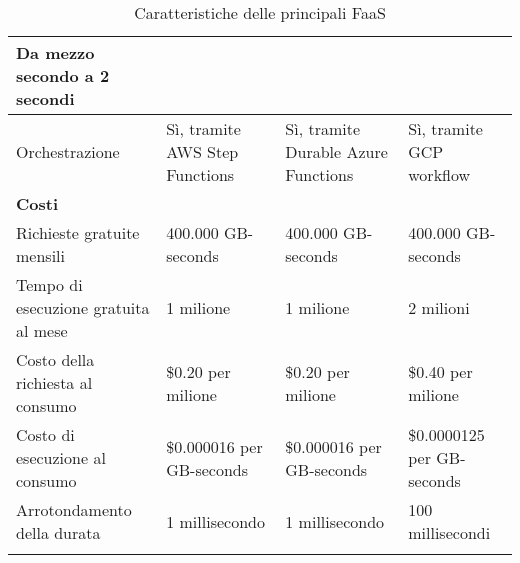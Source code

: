 \begin{longtable} {|P{3.5cm}|P{3.7cm}|P{3.7cm}|P{3.7cm}|}
    Da mezzo secondo a 2 secondi                                                                                                                                               \\
    \hline
    Orchestrazione                                  &
    Sì, tramite AWS Step Functions                  &
    Sì, tramite Durable Azure Functions             &
    Sì, tramite GCP workflow                                                                                                                                                   \\
    \hline
    \textbf{Costi}                                  &                                                             &                          &                                 \\
    \hline
    Richieste gratuite mensili                      &
    400.000 GB-seconds                              &
    400.000 GB-seconds                              &
    400.000 GB-seconds                                                                                                                                                         \\
    \hline
    Tempo di esecuzione gratuita al mese            &
    1 milione                                       &
    1 milione                                       &
    2 milioni                                                                                                                                                                  \\
    \hline
    Costo della richiesta al consumo                &
    \$0.20 per milione                              &
    \$0.20 per milione                              &
    \$0.40 per milione                                                                                                                                                         \\
    \hline
    Costo di esecuzione al consumo                  &
    \$0.000016 per GB-seconds                       &
    \$0.000016 per GB-seconds                       &
    \$0.0000125 per GB-seconds                                                                                                                                                 \\
    \hline
    Arrotondamento della durata                     &
    1 millisecondo                                  &
    1 millisecondo                                  &
    100 millisecondi                                                                                                                                                           \\
    \hline
    \caption{Caratteristiche delle principali FaaS}
\end{longtable}

